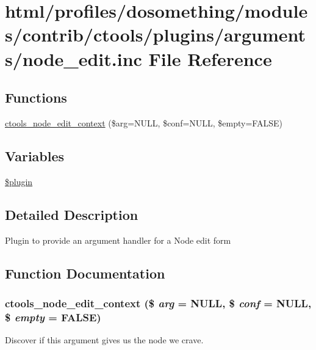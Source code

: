 \hypertarget{plugins_2arguments_2node__edit_8inc}{
\section{html/profiles/dosomething/modules/contrib/ctools/plugins/arguments/node\_\-edit.inc File Reference}
\label{plugins_2arguments_2node__edit_8inc}
}
\subsection*{Functions}
\begin{DoxyCompactItemize}
\item 
\hyperlink{plugins_2arguments_2node__edit_8inc_a4c7b4a63a823cf2f98bd4c983c187f77}{ctools\_\-node\_\-edit\_\-context} (\$arg=NULL, \$conf=NULL, \$empty=FALSE)
\end{DoxyCompactItemize}
\subsection*{Variables}
\begin{DoxyCompactItemize}
\item 
\hyperlink{plugins_2arguments_2node__edit_8inc_ada8a7130088351710bb02ed622d6bf65}{\$plugin}
\end{DoxyCompactItemize}


\subsection{Detailed Description}
Plugin to provide an argument handler for a Node edit form 

\subsection{Function Documentation}
\hypertarget{plugins_2arguments_2node__edit_8inc_a4c7b4a63a823cf2f98bd4c983c187f77}{
\subsubsection[{ctools\_\-node\_\-edit\_\-context}]{\setlength{\rightskip}{0pt plus 5cm}ctools\_\-node\_\-edit\_\-context (\$ {\em arg} = {\ttfamily NULL}, \/  \$ {\em conf} = {\ttfamily NULL}, \/  \$ {\em empty} = {\ttfamily FALSE})}}
\label{plugins_2arguments_2node__edit_8inc_a4c7b4a63a823cf2f98bd4c983c187f77}
Discover if this argument gives us the node we crave. 

